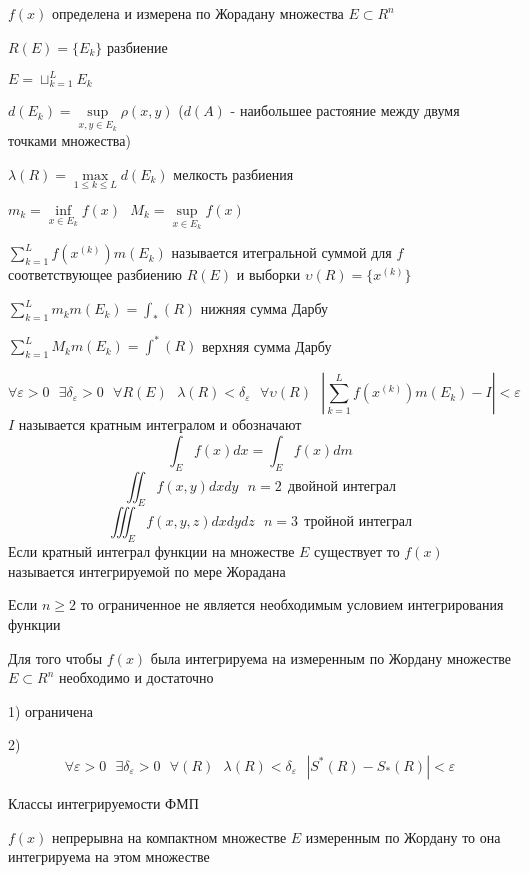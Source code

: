 \begin{block}[Обозначения]
  $f(x)$ определена и измерена по Жорадану множества $E \subset R^n$

  $R(E) = \{E_k\}$ разбиение

  $E = \sqcup_{k=1}^L E_k$

  $d(E_k) = \sup \limits_{x,y \in E_k} \rho(x,y)$ ($d(A)$ - наибольшее
  растояние между двумя точками множества)

  $\lambda(R) = \max \limits_{1 \le k \le L} d(E_k)$ мелкость разбиения

  $m_k = \inf \limits_{x \in E_k} f(x) ~~~ M_k = \sup \limits_{x \in E_k} f(x)$

  $\sum_{k=1}^L f(x^{(k)}) m(E_k)$ называется итегральной суммой для $f$
  соответствующее разбиению $R(E)$ и выборки $\upsilon(R) = \{x^{(k)}\}$

  $\sum_{k=1}^L m_k m(E_k) = \int_* (R)$ нижняя сумма Дарбу

  $\sum_{k=1}^L M_k m(E_k) = \int^* (R)$ верхняя сумма Дарбу
\end{block}

\begin{define}
  $$
  \forall \varepsilon > 0 ~~~ \exists \delta_{\varepsilon} > 0 ~~~
  \forall R(E) ~~~ \lambda(R) < \delta_{\varepsilon} ~~~
  \forall \upsilon(R) ~~~ \left| \sum_{k=1}^L f(x^{(k)}) m(E_k) - I \right|
  < \varepsilon
  $$
  $I$ называется кратным интегралом и обозначают
  $$
  \int_E f(x) dx = \int_E f(x) dm
  $$
  $$
  \iint_E f(x,y) dxdy ~~~ n = 2 ~~ \text{двойной интеграл}
  $$
  $$
  \iiint_E f(x,y,z) dxdydz ~~~ n = 3 ~~ \text{тройной интеграл}
  $$
  Если кратный интеграл функции на множестве $E$ существует то $f(x)$
  называется интегрируемой по мере Жорадана

  Если $n \ge 2$ то ограниченное не является необходимым условием
  интегрирования функции
\end{define}

\begin{block}
  Для того чтобы $f(x)$ была интегрируема на измеренным по Жордану множестве
  $E \subset R^n$ необходимо и достаточно

  1) ограничена

  2)
  $$
  \forall \varepsilon > 0 ~~~ \exists \delta_{\varepsilon} > 0 ~~~ \forall(R)
  ~~~ \lambda(R) < \delta_{\varepsilon} ~~~ \left| S^*(R) - S_*(R) \right| <
  \varepsilon
  $$
\end{block}

\begin{title}[\Large]
  Классы интегрируемости ФМП
\end{title}

\begin{theorem}
  $f(x)$ непрерывна на компактном множестве $E$ измеренным по Жордану то она
  интегрируема на этом множестве
\end{theorem}